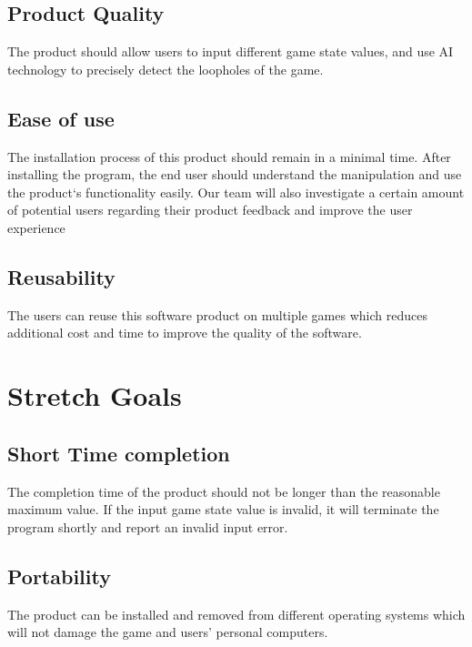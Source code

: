 \documentclass{article}
\begin{document}
\subsection{Product Quality}
The product should allow users to input different game state values, and use AI technology to precisely detect the loopholes of the game. 

\subsection{Ease of use}
The installation process of this product should remain in a minimal time. After installing the program, the end user should understand the manipulation and use the product‘s functionality easily. Our team will also investigate a certain amount of potential users regarding their product feedback and improve the user experience
\subsection{Reusability}
The users can reuse this software product on multiple games which reduces additional cost and time to improve the quality of the software. 
\section{Stretch Goals}
\subsection{Short Time completion}
The completion time of the product should not be longer than the reasonable maximum value. If the input game state value is invalid, it will terminate the program shortly and report an invalid input error.
\subsection{Portability}
The product can be installed and removed from different operating systems which will not damage the game and users' personal computers. 
\end{document}
